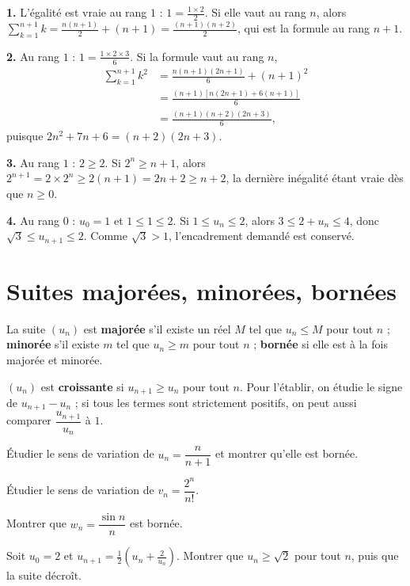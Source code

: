 \begin{corrige}
\textbf{1.} L'égalité est vraie au rang $1$ : $1 = \frac{1\times2}{2}$. Si
elle vaut au rang $n$, alors
$\sum_{k=1}^{n+1}k = \frac{n(n+1)}{2}+(n+1) = \frac{(n+1)(n+2)}{2}$, qui est
la formule au rang $n+1$.

\textbf{2.} Au rang $1$ : $1 = \frac{1\times2\times3}{6}$. Si la formule vaut
au rang $n$,
\[
  \begin{aligned}
  \sum_{k=1}^{n+1}k^{2} &= \frac{n(n+1)(2n+1)}{6}+(n+1)^{2}
  \\ &= \frac{(n+1)\left[n(2n+1)+6(n+1)\right]}{6}
  \\ &= \frac{(n+1)(n+2)(2n+3)}{6},
  \end{aligned}
\]
puisque $2n^{2}+7n+6 = (n+2)(2n+3)$.

\textbf{3.} Au rang $1$ : $2 \geq 2$. Si $2^{n} \geq n+1$, alors
$2^{n+1} = 2\times2^{n} \geq 2(n+1) = 2n+2 \geq n+2$, la dernière inégalité
étant vraie dès que $n \geq 0$.

\textbf{4.} Au rang $0$ : $u_{0} = 1$ et $1 \leq 1 \leq 2$. Si
$1 \leq u_{n} \leq 2$, alors $3 \leq 2+u_{n} \leq 4$, donc
$\sqrt3 \leq u_{n+1} \leq 2$. Comme $\sqrt3 > 1$, l'encadrement demandé est
conservé.
\end{corrige}

\section{Suites majorées, minorées, bornées}

\begin{definition}
La suite $(u_{n})$ est \textbf{majorée} s'il existe un réel $M$ tel que
$u_{n} \leq M$ pour tout $n$ ; \textbf{minorée} s'il existe $m$ tel que
$u_{n} \geq m$ pour tout $n$ ; \textbf{bornée} si elle est à la fois majorée
et minorée.
\end{definition}

\begin{propriete}[monotonie]
$(u_{n})$ est \textbf{croissante} si $u_{n+1} \geq u_{n}$ pour tout $n$. Pour
l'établir, on étudie le signe de $u_{n+1}-u_{n}$ ; si tous les termes sont
strictement positifs, on peut aussi comparer $\dfrac{u_{n+1}}{u_{n}}$ à $1$.
\end{propriete}

\begin{entrainement}
\exo[\niveau{1}] Étudier le sens de variation de $u_{n} = \dfrac{n}{n+1}$ et
montrer qu'elle est bornée.

\exo[\niveau{2}] Étudier le sens de variation de $v_{n} = \dfrac{2^{n}}{n!}$.

\exo[\niveau{2}] Montrer que $w_{n} = \dfrac{\sin n}{n}$ est bornée.

\exo[\niveau{3}] Soit $u_{0} = 2$ et $u_{n+1} = \frac12\left(u_{n}
+\frac{2}{u_{n}}\right)$. Montrer que $u_{n} \geq \sqrt2$ pour tout $n$, puis
que la suite décroît.
\end{entrainement}

